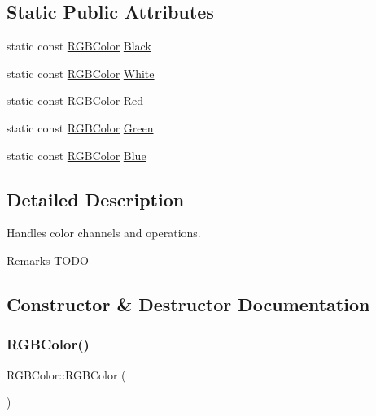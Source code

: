 \subsection*{Static Public Attributes}
\begin{DoxyCompactItemize}
\item 
static const \hyperlink{class_r_g_b_color}{R\+G\+B\+Color} \hyperlink{class_r_g_b_color_a72f06dff766cb98998ef01f7018e1218}{Black}
\item 
static const \hyperlink{class_r_g_b_color}{R\+G\+B\+Color} \hyperlink{class_r_g_b_color_a2de4286a7090037773a2f3cd98685486}{White}
\item 
static const \hyperlink{class_r_g_b_color}{R\+G\+B\+Color} \hyperlink{class_r_g_b_color_a200488d3a3adcd67b66c452973f18c75}{Red}
\item 
static const \hyperlink{class_r_g_b_color}{R\+G\+B\+Color} \hyperlink{class_r_g_b_color_afaabce4b28b3e9306271830bebdfc7ab}{Green}
\item 
static const \hyperlink{class_r_g_b_color}{R\+G\+B\+Color} \hyperlink{class_r_g_b_color_a65d9d43015d92b2aab0d850bb73534db}{Blue}
\end{DoxyCompactItemize}


\subsection{Detailed Description}
Handles color channels and operations. \begin{DoxyRemark}{Remarks}
T\+O\+DO 
\end{DoxyRemark}


\subsection{Constructor \& Destructor Documentation}
\hypertarget{class_r_g_b_color_a9383ce7b63b0a6ada5d4e54e16adf733}{}\label{class_r_g_b_color_a9383ce7b63b0a6ada5d4e54e16adf733} 
\subsubsection{\texorpdfstring{R\+G\+B\+Color()}{RGBColor()}\hspace{0.1cm}{\footnotesize\ttfamily [1/3]}}
{\footnotesize\ttfamily R\+G\+B\+Color\+::\+R\+G\+B\+Color (\begin{DoxyParamCaption}{ }\end{DoxyParamCaption})}

